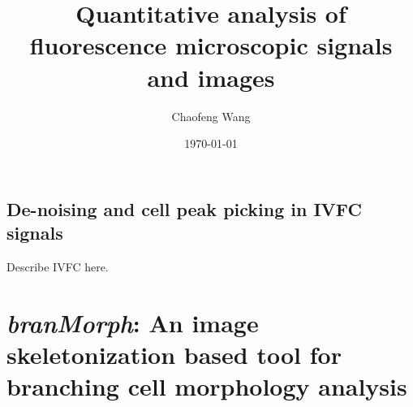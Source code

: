\documentclass[openright,twoside,a4paper,12pt]{book}
\title{Quantitative analysis of fluorescence microscopic signals and images}
\author{Chaofeng Wang}
\date{\today}
\begin{document}

\maketitle

\frontmatter



% 


\wcfToc

\makeatletter\@openrightfalse
\wcfLot
\wcfLof
% 
\printglossary[type=\acronymtype,style=long]

\@openrighttrue\makeatother

\mainmatter

\begin{refsection}





\part{De-noising and cell peak picking in IVFC signals}


% 
Describe IVFC here.

\end{refsection}


\part{\emph{branMorph}: An image skeletonization based tool for branching cell morphology analysis}
\begin{refsection}

% 


\end{refsection}
\end{document}
